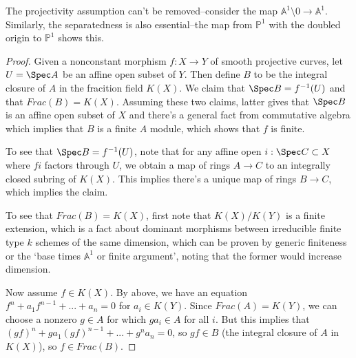 \begin{rem}
The projectivity assumption can't be removed--consider the map $\mathbb{A}^1\setminus 0 \to \mathbb{A}^1$. Similarly, the separatedness is also essential--the map from $\mathbb{P}^1$ with the doubled origin to $\mathbb{P}^1$ shows this. 
\end{rem}

\begin{proof}
Given a nonconstant morphism $f:X \to Y$ of smooth projective curves, let $U = \Spec A$ be an affine open subset of $Y$. Then define $B$ to be the integral closure of $A$ in the fracition field $K(X)$. We claim that $\Spec B = f^{-1}(U)$ and that $Frac(B) = K(X)$. Assuming these two claims, latter gives that $\Spec B$ is an affine open subset of $X$ and there's a general fact from commutative algebra which implies that $B$ is a finite $A$ module, which shows that $f$ is finite.

To see that $\Spec B = f^{-1}(U)$, note that for any affine open $i: \Spec C \subset X$ where $fi$ factors through $U$, we obtain a map of rings $A \to C$ to an integrally closed subring of $K(X)$. This implies there's a unique map of rings $B \to C$, which implies the claim.

To see that $Frac(B) = K(X)$, first note that $K(X)/K(Y)$ is a finite extension, which is a fact about dominant morphisms between irreducible finite type $k$ schemes of the same dimension, which can be proven by generic finiteness or the \lq base times $\mathbb{A}^1$ or finite argument\rq{}, noting that the former would increase dimension.

Now assume $f \in K(X)$. By above, we have an equation $f^n + a_{1}f^{n-1} + ... + a_n = 0$ for $a_i \in K(Y)$. Since $Frac(A) = K(Y)$, we can choose a nonzero $g \in A$ for which $ga_i \in A$ for all $i$. But this implies that $(gf)^n + ga_1(gf)^{n-1} + ... + g^na_n = 0$, so $gf \in B$ (the integral closure of $A$ in $K(X)$), so $f \in Frac(B)$. 
\end{proof}